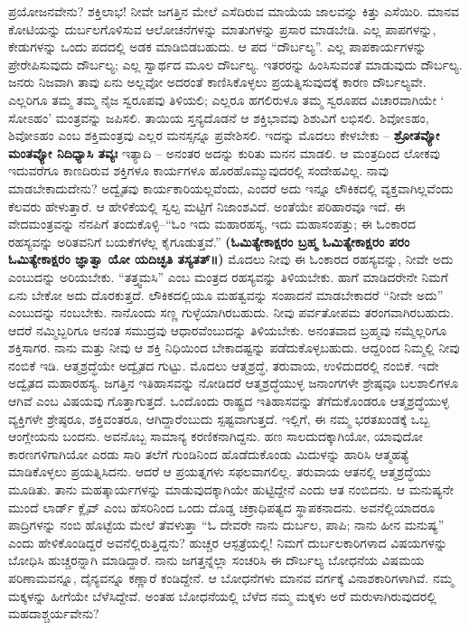 ಪ್ರಯೋಜನವೇನು? ಶಕ್ತಿಲಾಭ! ನೀವೇ ಜಗತ್ತಿನ ಮೇಲೆ ಎಸೆದಿರುವ ಮಾಯೆಯ ಜಾಲವನ್ನು ಕಿತ್ತು ಎಸೆಯಿರಿ. ಮಾನವ ಕೋಟಿಯನ್ನು ದುರ್ಬಲಗೊಳಿಸುವ ಆಲೋಚನೆಗಳನ್ನು ಮಾತುಗಳನ್ನು ಪ್ರಸಾರ ಮಾಡಬೇಡಿ. ಎಲ್ಲ ಪಾಪಗಳನ್ನು, ಕೇಡುಗಳನ್ನು ಒಂದು ಪದದಲ್ಲಿ ಅಡಕ ಮಾಡಿಬಿಡಬಹುದು. ಆ ಪದ “ದೌರ್ಬಲ್ಯ”. ಎಲ್ಲ ಪಾಪಕಾರ್ಯಗಳನ್ನು ಪ್ರೇರೇಪಿಸುವುದು ದೌರ್ಬಲ್ಯ; ಎಲ್ಲ ಸ್ವಾರ್ಥದ ಮೂಲ ದೌರ್ಬಲ್ಯ. ಇತರರನ್ನು ಹಿಂಸಿಸುವಂತೆ ಮಾಡುವುದು ದೌರ್ಬಲ್ಯ. ಜನರು ನಿಜವಾಗಿ ತಾವು ಏನು ಅಲ್ಲವೋ ಅದರಂತೆ ಕಾಣಿಸಿಕೊಳ್ಳಲು ಪ್ರಯತ್ನಿಸುವುದಕ್ಕೆ ಕಾರಣ ದೌರ್ಬಲ್ಯವೇ. ಎಲ್ಲರಿಗೂ ತಮ್ಮ ತಮ್ಮ ನೈಜ ಸ್ವರೂಪವು ತಿಳಿಯಲಿ; ಎಲ್ಲರೂ ಹಗಲಿರುಳೂ ತಮ್ಮ ಸ್ವರೂಪದ ವಿಚಾರವಾಗಿಯೇ ‘ ಸೋಽಹಂ’ ಮಂತ್ರವನ್ನು ಜಪಿಸಲಿ. ತಾಯಿಯ ಸ್ತನ್ಯದೊಡನೆ ಆ ಶಕ್ತಿಭಾವವು ಶಿಶುವಿಗೆ ಲಭಿಸಲಿ. ಶಿವೋಽಹಂ, ಶಿವೋಽಹಂ ಎಂಬ ಶಕ್ತಿಮಂತ್ರವು ಎಲ್ಲರ ಮನಸ್ಸನ್ನೂ ಪ್ರವೇಶಿಸಲಿ. ಇದನ್ನು ಮೊದಲು ಕೇಳಬೇಕು – \textbf{ಶ್ರೋತವ್ಯೋ ಮಂತವ್ಯೋ ನಿದಿಧ್ಯಾಸಿ ತವ್ಯಃ} ಇತ್ಯಾದಿ – ಅನಂತರ ಅದನ್ನು ಕುರಿತು ಮನನ ಮಾಡಲಿ. ಆ ಮಂತ್ರದಿಂದ ಲೋಕವು ಇದುವರೆಗೂ ಕಾಣದಿರುವ ಶಕ್ತಿಗಳೂ ಕಾರ್ಯಗಳೂ ಹೊರಹೊಮ್ಮುವುದರಲ್ಲಿ ಸಂದೇಹವಿಲ್ಲ. ನಾವು ಮಾಡಬೇಕಾದುದೇನು? ಅದ್ವೈತವು ಕಾರ್ಯಕಾರಿಯಲ್ಲವೆಂದು, ಎಂದರೆ ಅದು ಇನ್ನೂ ಲೌಕಿಕದಲ್ಲಿ ವ್ಯಕ್ತವಾಗಿಲ್ಲವೆಂದು ಕೆಲವರು ಹೇಳುತ್ತಾರೆ. ಆ ಹೇಳಿಕೆಯಲ್ಲಿ ಸ್ವಲ್ಪ ಮಟ್ಟಿಗೆ ನಿಜಾಂಶವಿದೆ. ಅಂತೆಯೇ ಪರಿಹಾರವೂ ಇದೆ. ಈ ವೇದಮಂತ್ರವನ್ನು ನೆನಪಿಗೆ ತಂದುಕೊಳ್ಳಿ–“ಓಂ ಇದು ಮಹಾರಹಸ್ಯ, ಇದು ಮಹಾಸಂಪತ್ತು; ಈ ಓಂಕಾರದ ರಹಸ್ಯವನ್ನು ಅರಿತವನಿಗೆ ಬಯಕೆಗಳೆಲ್ಲ ಕೈಗೂಡುತ್ತವೆ.” \textbf{(ಓಮಿತ್ಯೇಕಾಕ್ಷರಂ ಬ್ರಹ್ಮ ಓಮಿತ್ಯೇಕಾಕ್ಷರಂ ಪರಂ ಓಮಿತ್ಯೇಕಾಕ್ಷರಂ ಜ್ಞಾತ್ವಾ ಯೋ ಯದಿಚ್ಛತಿ ತಸ್ಯತತ್​॥)} ಮೊದಲು ನೀವು ಈ ಓಂಕಾರದ ರಹಸ್ಯವನ್ನು, ನೀವೇ ಅದು ಎಂಬುದನ್ನು ಅರಿಯಬೇಕು. “ತತ್ತ್ವಮಸಿ” ಎಂಬ ಮಂತ್ರದ ರಹಸ್ಯವನ್ನು ತಿಳಿಯಬೇಕು. ಹಾಗೆ ಮಾಡಿದರೇನೇ ನಿಮಗೆ ಏನು ಬೇಕೋ ಅದು ದೊರಕುತ್ತದೆ. ಲೌಕಿಕದಲ್ಲಿಯೂ ಮಹತ್ವವನ್ನು ಸಂಪಾದನೆ ಮಾಡಬೇಕಾದರೆ “ನೀವೇ ಅದು” ಎಂಬುದನ್ನು ನಂಬಬೇಕು. ನಾನೊಂದು ಸಣ್ಣ ಗುಳ್ಳೆಯಾಗಿರಬಹುದು. ನೀವು ಪರ್ವತೋಪಮ ತರಂಗವಾಗಿರಬಹುದು. ಆದರೆ ನಮ್ಮಿಬ್ಬರಿಗೂ ಅನಂತ ಸಮುದ್ರವು ಆಧಾರವೆಂಬುದನ್ನು ತಿಳಿಯಬೇಕು. ಅನಂತವಾದ ಬ್ರಹ್ಮವು ನಮ್ಮೆಲ್ಲರಿಗೂ ಶಕ್ತಿಸಾಗರ. ನಾನು ಮತ್ತು ನೀವು ಆ ಶಕ್ತಿ ನಿಧಿಯಿಂದ ಬೇಕಾದಷ್ಟನ್ನು ಪಡೆದುಕೊಳ್ಳಬಹುದು. ಆದ್ದರಿಂದ ನಿಮ್ಮಲ್ಲಿ ನೀವು ನಂಬಿಕೆ ಇಡಿ. ಆತ್ಮಶ್ರದ್ಧೆಯೇ ಅದ್ವೈತದ ಗುಟ್ಟು. ಮೊದಲು ಆತ್ಮಶ್ರದ್ಧೆ, ತರುವಾಯ, ಉಳಿದುದರಲ್ಲಿ ನಂಬಿಕೆ. ಇದೇ ಅದ್ವೈತದ ಮಹಾರಹಸ್ಯ. ಜಗತ್ತಿನ ಇತಿಹಾಸವನ್ನು ನೋಡಿದರೆ ಆತ್ಮಶ್ರದ್ಧೆಯುಳ್ಳ ಜನಾಂಗಗಳೇ ಶ್ರೇಷ್ಠವೂ ಬಲಶಾಲಿಗಳೂ ಆಗಿವೆ ಎಂಬ ವಿಷಯವು ಗೊತ್ತಾಗುತ್ತದೆ. ಒಂದೊಂದು ರಾಷ್ಟ್ರದ ಇತಿಹಾಸವನ್ನು ತೆಗೆದುಕೊಂಡರೂ ಆತ್ಮಶ್ರದ್ಧೆಯುಳ್ಳ ವ್ಯಕ್ತಿಗಳೇ ಶ್ರೇಷ್ಠರೂ, ಶಕ್ತಿವಂತರೂ, ಆಗಿದ್ದಾರೆಂಬುದು ಸ್ಪಷ್ಟವಾಗುತ್ತದೆ. ಇಲ್ಲಿಗೆ, ಈ ನಮ್ಮ ಭರತಖಂಡಕ್ಕೆ ಒಬ್ಬ ಆಂಗ್ಲೇಯನು ಬಂದನು. ಅವನೊಬ್ಬ ಸಾಮಾನ್ಯ ಕರಣಿಕನಾಗಿದ್ದನು. ಹಣ ಸಾಲದುದಕ್ಕಾಗಿಯೋ, ಯಾವುದೋ ಕಾರಣಗಳಿಗಾಗಿಯೋ ಎರಡು ಸಾರಿ ತಲೆಗೆ ಗುಂಡಿನಿಂದ ಹೊಡೆದುಕೊಂಡು ಮಿದುಳನ್ನು ಹಾರಿಸಿ ಆತ್ಮಹತ್ಯೆ ಮಾಡಿಕೊಳ್ಳಲು ಪ್ರಯತ್ನಿಸಿದನು. ಆದರೆ ಆ ಪ್ರಯತ್ನಗಳು ಸಫಲವಾಗಲಿಲ್ಲ. ತರುವಾಯ ಆತನಲ್ಲಿ ಆತ್ಮಶ್ರದ್ಧೆಯು ಮೂಡಿತು. ತಾನು ಮಹತ್ಕಾರ್ಯಗಳನ್ನು ಮಾಡುವುದಕ್ಕಾಗಿಯೇ ಹುಟ್ಟಿದ್ದೇನೆ ಎಂದು ಆತ ನಂಬಿದನು. ಆ ಮನುಷ್ಯನೇ ಮುಂದೆ ಲಾರ್ಡ್​ ಕ್ಲೈವ್​ ಎಂಬ ಹೆಸರಿನಿಂದ ಒಂದು ದೊಡ್ಡ ಚಕ್ರಾಧಿಪತ್ಯದ ಸ್ಥಾಪಕನಾದನು. ಅವನೆಲ್ಲಿಯಾದರೂ ಪಾದ್ರಿಗಳನ್ನು ನಂಬಿ ಹೊಟ್ಟೆಯ ಮೇಲೆ ತೆವಳುತ್ತಾ “ಓ ದೇವರೇ ನಾನು ದುರ್ಬಲ, ಪಾಪಿ; ನಾನು ಹೀನ ಮನುಷ್ಯ” ಎಂದು ಹೇಳಿಕೊಂಡಿದ್ದರೆ ಅವನೆಲ್ಲಿರುತ್ತಿದ್ದನು? ಹುಚ್ಚರ ಆಸ್ಪತ್ರೆಯಲ್ಲಿ! ನಿಮಗೆ ದುರ್ಬಲಕಾರಿಗಳಾದ ವಿಷಯಗಳನ್ನು ಬೋಧಿಸಿ ಹುಚ್ಚರನ್ನಾಗಿ ಮಾಡಿದ್ದಾರೆ. ನಾನು ಜಗತ್ತನ್ನೆಲ್ಲಾ ಸಂಚರಿಸಿ ಈ ದೌರ್ಬಲ್ಯ ಬೋಧನೆಯ ವಿಷಮಯ ಪರಿಣಾಮವನ್ನೂ, ದೈನ್ಯವನ್ನೂ ಕಣ್ಣಾರೆ ಕಂಡಿದ್ದೇನೆ. ಆ ಬೋಧನೆಗಳು ಮಾನವ ವರ್ಗಕ್ಕೆ ವಿನಾಶಕಾರಿಗಳಾಗಿವೆ. ನಮ್ಮ ಮಕ್ಕಳನ್ನು ಹೀಗೆಯೇ ಬೆಳೆಸಿದ್ದೇವೆ. ಅಂತಹ ಬೋಧನೆಯಲ್ಲಿ ಬೆಳೆದ ನಮ್ಮ ಮಕ್ಕಳು ಅರೆ ಮರುಳಾಗಿರುವುದರಲ್ಲಿ ಮಹದಾಶ್ಚರ್ಯವೇನು?

